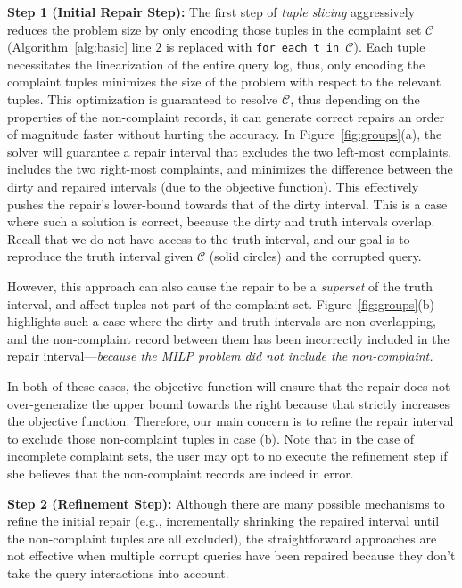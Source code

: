 \smallskip
\noindent\textbf{Step 1 (Initial Repair Step):}
The first step of  \emph{tuple slicing} 
aggressively reduces the problem size by only encoding those 
tuples in the complaint set $\mathcal{C}$ (Algorithm~\ref{alg:basic} line $2$
is replaced with \texttt{for each t in $\mathcal{C}$}). 
Each tuple necessitates
the linearization of the entire query log, thus, only encoding the complaint tuples minimizes the 
size of the problem with respect to the relevant tuples. 
This optimization is guaranteed to resolve $\mathcal{C}$, thus depending on the properties of the non-complaint records, it can generate correct repairs
an order of magnitude faster without hurting the accuracy. 
In Figure~\ref{fig:groups}(a),
the solver will guarantee a repair interval that excludes the two left-most complaints, includes the two right-most complaints,
and minimizes the difference between the dirty and repaired intervals (due to the objective function).
This effectively pushes the repair's lower-bound towards that of the dirty interval.
This is a case where such a solution is correct, because the dirty and truth intervals overlap.
Recall that we do not have access to the truth interval, and our goal is to reproduce the truth interval given $\mathcal{C}$ (solid circles) and the corrupted query.

However, this approach can also cause the repair to be a {\it superset} of the truth interval, and affect tuples not part of the complaint set.
Figure~\ref{fig:groups}(b) highlights such a case where the dirty and truth intervals are non-overlapping, and the non-complaint record between them has been incorrectly included in the repair interval---\emph{because the MILP problem did not include the non-complaint.}





\indent In both of these cases, the objective function will ensure that the repair
does not over-generalize the upper bound towards the right because that strictly increases the objective function.
Therefore, our main concern is to refine the repair interval to exclude those non-complaint tuples in case (b).
Note that in the case of incomplete complaint sets, the user may opt to no execute the refinement step if she believes
that the non-complaint records are indeed in error.

\smallskip

\noindent\textbf{Step 2 (Refinement Step):} 
Although there are many possible mechanisms to refine the initial repair (e.g., incrementally shrinking
the repaired interval until the non-complaint tuples are all excluded), 
the straightforward approaches are not effective when multiple corrupt 
queries have been repaired because they don't take the query interactions into account.

